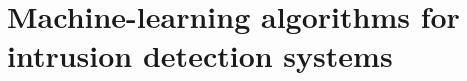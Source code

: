 \chapter{Machine-learning algorithms for intrusion detection systems}
\label{cha:2}





%
%

\FloatBarrier